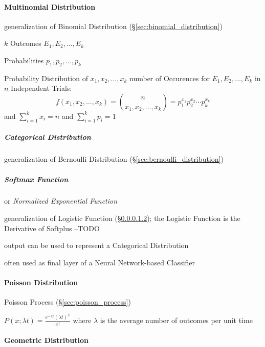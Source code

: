 \paragraph{Multinomial Distribution}\label{sec:multinomial_distribution}\hfill

generalization of Binomial Distribution (\S\ref{sec:binomial_distribution})

$k$ Outcomes $E_1, E_2, \ldots, E_k$

Probabilities $p_1, p_2, \ldots, p_k$

Probability Distribution of $x_1, x_2, \ldots, x_k$ number of
Occurences for $E_1, E_2, \ldots, E_k$ in $n$ Independent Trials:
\[
  f(x_1, x_2, \ldots, x_k) = \binom{n}{x_1, x_2, \ldots, x_k} =
  p_1^{x_1} p_2^{x_2} \cdots p_k^{x_k}
\]
and $\sum_{i=1}^k x_i = n$ and $\sum_{i=1}^k {p_i} = 1$



\subparagraph{Categorical Distribution}\label{sec:categorical_distribution}
\hfill

generalization of Bernoulli Distribution (\S\ref{sec:bernoulli_distribution})



\subparagraph{Softmax Function}\label{sec:softmax}
\hfill

or \emph{Normalized Exponential Function}

generalization of Logistic Function (\S\ref{sec:softmax}); the Logistic Function
is the Derivative of Softplus --TODO

output can be used to represent a Categorical Distribution

often used as final layer of a Neural Network-based Classifier



\paragraph{Poisson Distribution}\label{sec:poisson_distribution}\hfill

Poisson Process (\S\ref{sec:poisson_process})

$P(x; \lambda t) = \frac{e^{-\lambda t} (\lambda t)^x}{x!}$
where $\lambda$ is the average number of outcomes per unit time



\paragraph{Geometric Distribution}\label{sec:geometric_distribution}
\hfill

